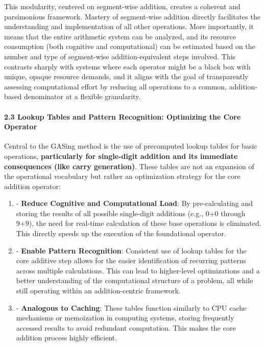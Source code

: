 \documentclass[11pt,a4paper]{article}
\begin{document}
This modularity, centered on segment-wise addition, creates a coherent and parsimonious framework. Mastery of segment-wise addition directly facilitates the understanding and implementation of all other operations. More importantly, it means that the entire arithmetic system can be analyzed, and its resource consumption (both cognitive and computational) can be estimated based on the number and type of segment-wise addition-equivalent steps involved. This contrasts sharply with systems where each operator might be a black box with unique, opaque resource demands, and it aligns with the goal of transparently assessing computational effort by reducing all operations to a common, addition-based denominator at a flexible granularity.

\paragraph{2.3 Lookup Tables and Pattern Recognition: Optimizing the Core Operator}
Central to the GASing method is the use of precomputed lookup tables for basic operations, \textbf{particularly for single-digit addition and its immediate consequences (like carry generation)}. These tables are not an expansion of the operational vocabulary but rather an optimization strategy for the core addition operator:

\begin{enumerate}
  \item - \textbf{Reduce Cognitive and Computational Load}: By pre-calculating and storing the results of all possible single-digit additions (e.g., 0+0 through 9+9), the need for real-time calculation of these base operations is eliminated. This directly speeds up the execution of the foundational operator.
  \item - \textbf{Enable Pattern Recognition}: Consistent use of lookup tables for the core additive step allows for the easier identification of recurring patterns across multiple calculations. This can lead to higher-level optimizations and a better understanding of the computational structure of a problem, all while still operating within an addition-centric framework.
  \item - \textbf{Analogous to Caching}: These tables function similarly to CPU cache mechanisms or memoization in computing systems, storing frequently accessed results to avoid redundant computation. This makes the core addition process highly efficient.
\end{enumerate}
\end{document}
